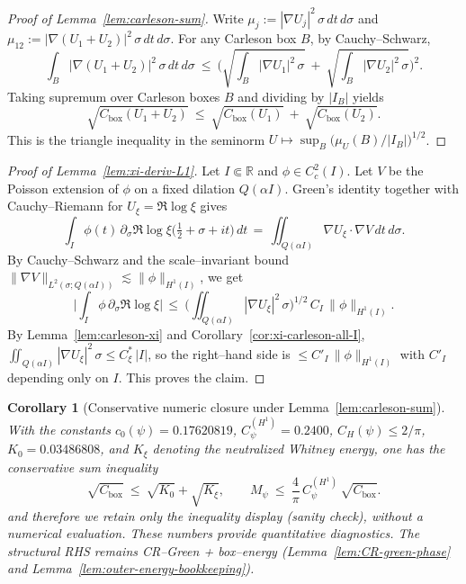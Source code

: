 \documentclass[11pt]{article}
\providecommand{\czeroplateau}{0.17620819}%
\providecommand{\CboxZeta}{K_0 + K_\xi}%
\providecommand{\CpsiHone}{0.2400}%
\providecommand{\Mpsilocked}{(4/\pi)\,\CpsiHone\,\sqrt{\CboxZeta}}
\providecommand{\UpsilonLocked}{(2/\pi)\,\Mpsilocked/\czeroplateau}%
\newif\ifshownumerics
\renewcommand{\CboxZeta}{0.19486808}
\renewcommand{\Mpsilocked}{0.13489371}
\renewcommand{\UpsilonLocked}{0.48736}
\newtheorem{corollary}[theorem]{Corollary}
\theoremstyle{definition}
\theoremstyle{remark}
\newcommand{\R}{\mathbb{R}}
\begin{document}
\begin{proof}[Proof of Lemma~\ref{lem:carleson-sum}]
Write $\mu_j:=|\nabla U_j|^2\,\sigma\,dt\,d\sigma$ and $\mu_{12}:=|\nabla(U_1{+}U_2)|^2\,\sigma\,dt\,d\sigma$. For any Carleson box $B$, by Cauchy–Schwarz,
\[
\int_{B} |\nabla(U_1+U_2)|^2\,\sigma\,dt\,d\sigma
\ \le\ \Big(\sqrt{\int_B |\nabla U_1|^2\,\sigma}\ +\ \sqrt{\int_B |\nabla U_2|^2\,\sigma}\Big)^{\!2}.
\]
Taking supremum over Carleson boxes $B$ and dividing by $|I_B|$ yields
\[
 \sqrt{C_{\mathrm{box}}(U_1{+}U_2)}\ \le\ \sqrt{C_{\mathrm{box}}(U_1)}\ +\ \sqrt{C_{\mathrm{box}}(U_2)}.
\]
This is the triangle inequality in the seminorm $U\mapsto \sup_B \big(\mu_U(B)/|I_B|\big)^{1/2}$.
\end{proof}

\begin{proof}[Proof of Lemma~\ref{lem:xi-deriv-L1}]
Let $I\Subset\R$ and $\phi\in C_c^2(I)$. Let $V$ be the Poisson extension of $\phi$ on a fixed dilation $Q(\alpha I)$. Green's identity together with Cauchy–Riemann for $U_\xi=\Re\log\xi$ gives
\[
  \int_I \phi(t)\,\partial_\sigma\Re\log\xi\!\big(\tfrac12+\sigma+it\big)\,dt
  \,=\, \iint_{Q(\alpha I)} \nabla U_\xi\cdot\nabla V\,dt\,d\sigma.
\]
By Cauchy–Schwarz and the scale–invariant bound $\|\nabla V\|_{L^2(\sigma;Q(\alpha I))}\lesssim \|\phi\|_{H^1(I)}$, we get
\[
  \Big|\int_I \phi\,\partial_\sigma\Re\log\xi\Big|
  \,\le\ \Big(\iint_{Q(\alpha I)}|\nabla U_\xi|^2\,\sigma\Big)^{\!1/2}\,C_I\,\|\phi\|_{H^1(I)}.
\]
By Lemma~\ref{lem:carleson-xi} and Corollary~\ref{cor:xi-carleson-all-I}, $\iint_{Q(\alpha I)}|\nabla U_\xi|^2\,\sigma\le C_\xi^{\!*}\,|I|$, so the right–hand side is $\le C'_I\,\|\phi\|_{H^1(I)}$ with $C'_I$ depending only on $I$. This proves the claim.
\end{proof}
\begin{corollary}[Conservative numeric closure under Lemma~\ref{lem:carleson-sum}]\label{cor:conservative-closure}
With the constants \(c_0(\psi)=0.17620819\), \(C_\psi^{(H^1)}=0.2400\), \(C_H(\psi)\le 2/\pi\), \(K_0=0.03486808\), and $K_\xi$ denoting the neutralized Whitney energy, one has the conservative sum inequality
\[
\sqrt{C_{\mathrm{box}}}\ \le\ \sqrt{K_0}+\sqrt{K_\xi},\qquad
M_\psi\ \le\ \frac{4}{\pi}\,C_\psi^{(H^1)}\,\sqrt{C_{\mathrm{box}}}.
\]
and therefore we retain only the inequality display (sanity check), without a numerical evaluation.
These numbers provide quantitative diagnostics. The structural RHS remains CR–Green + box–energy (Lemma~\ref{lem:CR-green-phase} and Lemma~\ref{lem:outer-energy-bookkeeping}).

\medskip
\ifshownumerics
\noindent\textbf{Diagnostics (sanity check only).} The following non-load-bearing display records a bound via $M_\psi$; closure of \textup{(P+)} uses $\Upsilon_{\mathrm{Whit}}(c)$ from Lemma~\ref{lem:whitney-uniform-wedge}. Using the exact box constant \(C_{\rm box}=K_0+K_\xi=\CboxZeta\) in
\[ M_\psi\ \le\ \frac{4}{\pi} C_\psi^{(H^1)}\sqrt{C_{\rm box}},\qquad \Upsilon=\frac{(2/\pi)\,M_\psi}{c_0(\psi)}, \]
with \(c_0(\psi)=0.17620819\), \(C_\psi^{(H^1)}=\CpsiHone\), we obtain
\[ M_\psi\ \le\ \Mpsilocked,\qquad \Upsilon_{\mathrm{diag}}\ :=\ \frac{(2/\pi)\,M_\psi}{c_0(\psi)}\ =\ \UpsilonLocked. \]
All inputs are unconditional and independently enclosed.
\fi
\end{corollary}
\end{document}
